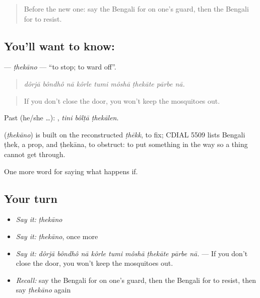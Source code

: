 \label{lesson:BN-C374-thekano}



\begin{quote}
Before the new one: say the Bengali for on one's guard, then the Bengali for to resist.
\end{quote}

\subsection*{You'll want to know: }
\textbf{} — \emph{ṭhekāno} — \textquotedblleft{}to stop; to ward off\textquotedblright{}.

\begin{quote}
        
\end{quote}

\begin{quote}
\emph{dôrjā bôndhô nā kôrle tumi môshā ṭhekāte pārbe nā.}
\end{quote}

\begin{quote}
If you don't close the door, you won't keep the mosquitoes out.
\end{quote}

Past (he/she …):   , \emph{tini bôlṭā ṭhekālen}.

\begin{cousinweb}
\textbf{} (\emph{ṭhekāno}) is built on the reconstructed \emph{ṭhēkk}, to fix; CDIAL 5509 lists Bengali ṭhek, a prop, and ṭhekāna, to obstruct: to put something in the way so a thing cannot get through.
\end{cousinweb}

\begin{grammarlens}[title={What you've built}]
One more word for saying what happens if.
\end{grammarlens}

\subsection*{Your turn}
\begin{itemize}
\raggedright
  \item \emph{Say it:} \emph{ṭhekāno}
  \item \emph{Say it:} \emph{ṭhekāno}, once more
  \item \emph{Say it:} \emph{dôrjā bôndhô nā kôrle tumi môshā ṭhekāte pārbe nā.} — If you don't close the door, you won't keep the mosquitoes out.
  \item \emph{Recall:} say the Bengali for on one's guard, then the Bengali for to resist, then say \emph{ṭhekāno} again
\end{itemize}

